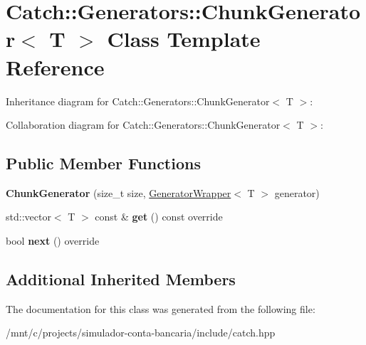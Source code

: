 \hypertarget{classCatch_1_1Generators_1_1ChunkGenerator}{}\section{Catch\+:\+:Generators\+:\+:Chunk\+Generator$<$ T $>$ Class Template Reference}
\label{classCatch_1_1Generators_1_1ChunkGenerator}


Inheritance diagram for Catch\+:\+:Generators\+:\+:Chunk\+Generator$<$ T $>$\+:


Collaboration diagram for Catch\+:\+:Generators\+:\+:Chunk\+Generator$<$ T $>$\+:
\subsection*{Public Member Functions}
\begin{DoxyCompactItemize}
\item 
\mbox{\label{classCatch_1_1Generators_1_1ChunkGenerator_a50c334d00cde3166d71e9b90ebc2d2e3}} 
{\bfseries Chunk\+Generator} (size\+\_\+t size, \hyperlink{classCatch_1_1Generators_1_1GeneratorWrapper}{Generator\+Wrapper}$<$ T $>$ generator)
\item 
\mbox{\label{classCatch_1_1Generators_1_1ChunkGenerator_aa41c7d08a165b6a18560f2ab9e977f0b}} 
std\+::vector$<$ T $>$ const  \& {\bfseries get} () const override
\item 
\mbox{\label{classCatch_1_1Generators_1_1ChunkGenerator_a545e89f80eb1e3c953491541ea083f86}} 
bool {\bfseries next} () override
\end{DoxyCompactItemize}
\subsection*{Additional Inherited Members}


The documentation for this class was generated from the following file\+:\begin{DoxyCompactItemize}
\item 
/mnt/c/projects/simulador-\/conta-\/bancaria/include/catch.\+hpp\end{DoxyCompactItemize}
